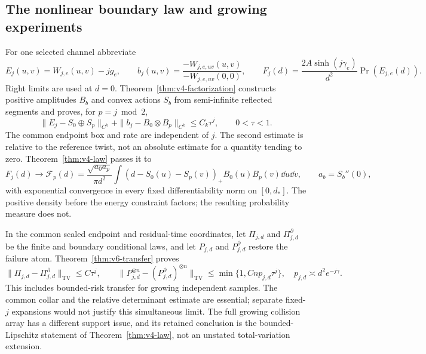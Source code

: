 \subsection{The nonlinear boundary law and growing experiments}
For one selected channel abbreviate
\[
 E_j(u,v)=W_{j,e}(u,v)-jg_e,\qquad
 b_j(u,v)=\frac{-W_{j,e,uv}(u,v)}{-W_{j,e,uv}(0,0)},\qquad
 F_j(d)=\frac{2A\sinh(j\gamma_e)}{d^2}\Pr(E_{j,e}(d)).
\]
Right limits are used at $d=0$. Theorem~\ref{thm:v4-factorization}
constructs positive amplitudes $B_b$ and convex actions $S_b$ from
semi-infinite reflected segments and proves, for $p=j\bmod2$,
\begin{equation}\label{eq:v6-main-relative}
 \|E_j-S_0\oplus S_p\|_{C^k}
       +\|b_j-B_0\otimes B_p\|_{C^k}\le C_k\tau^j,
                 \qquad 0<\tau<1.
\end{equation}
The common endpoint box and rate are independent of $j$. The second
estimate is relative to the reference twist, not an absolute estimate
for a quantity tending to zero. Theorem~\ref{thm:v4-law} passes it to
\[
 F_j(d)\longrightarrow\mathcal F_p(d)=
 \frac{\sqrt{a_0a_p}}{\pi d^2}
 \int(d-S_0(u)-S_p(v))_+B_0(u)B_p(v)\dd u\dd v,
 \qquad a_b=S_b''(0),
\]
with exponential convergence in every fixed differentiability norm on
$[0,d_*]$. The positive density before the energy constraint factors;
the resulting probability measure does not.

In the common scaled endpoint and residual-time coordinates, let
$\Pi_{j,d}$ and $\Pi^\partial_{j,d}$ be the finite and boundary
conditional laws, and let $P_{j,d}$ and $P^\partial_{j,d}$ restore the
failure atom. Theorem~\ref{thm:v6-transfer} proves
\[
 \|\Pi_{j,d}-\Pi^\partial_{j,d}\|_{\mathrm{TV}}\le C\tau^j,
 \qquad
 \|P_{j,d}^{\otimes n}-(P^\partial_{j,d})^{\otimes n}\|_{\mathrm{TV}}
                         \le \min\{1,Cnp_{j,d}\tau^j\},
 \quad p_{j,d}\asymp d^2e^{-j\gamma}.
\]
This includes bounded-risk transfer for growing independent samples.
The common collar and the relative determinant estimate are essential;
separate fixed-$j$ expansions would not justify this simultaneous limit.
The full growing collision array has a different support issue, and its
retained conclusion is the bounded-Lipschitz statement of
Theorem~\ref{thm:v4-law}, not an unstated total-variation extension.

